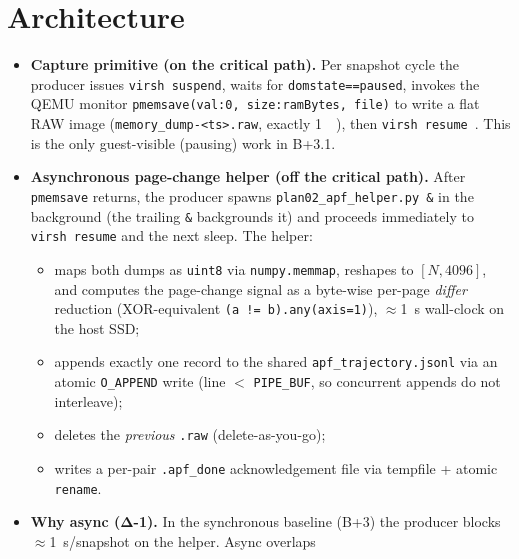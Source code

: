 \documentclass[conference]{IEEEtran}
\begin{document}
\section{Architecture}
\label{sec:arch}
\begin{itemize}
  \item \textbf{Capture primitive (on the critical path).} Per snapshot cycle
        the producer issues \texttt{virsh suspend}, waits for
        \texttt{domstate==paused}, invokes the QEMU monitor
        \texttt{pmemsave(val:0, size:ramBytes, file)} to write a flat RAW image
        (\texttt{memory\_dump-<ts>.raw}, exactly \SI{1}{\gibi\byte}), then
        \texttt{virsh resume}~\cite{TODO_libvirt_pmemsave}. This is the only
        guest-visible (pausing) work in B+3.1.
  \item \textbf{Asynchronous page-change helper (off the critical path).} After
        \texttt{pmemsave} returns, the producer spawns
        \texttt{plan02\_apf\_helper.py \&} in the background (the trailing
        \texttt{\&} backgrounds it) and proceeds immediately to
        \texttt{virsh resume} and the next sleep. The helper:
    \begin{itemize}
      \item maps both dumps as \texttt{uint8} via \texttt{numpy.memmap},
            reshapes to $[N,4096]$, and computes the page-change signal as a
            byte-wise per-page \emph{differ} reduction (XOR-equivalent
            \texttt{(a != b).any(axis=1)}), $\approx$\SI{1}{\second} wall-clock
            on the host SSD;
      \item appends exactly one record to the shared
            \texttt{apf\_trajectory.jsonl} via an atomic \texttt{O\_APPEND}
            write (line $<$ \texttt{PIPE\_BUF}, so concurrent appends do not
            interleave);
      \item deletes the \emph{previous} \texttt{.raw} (delete-as-you-go);
      \item writes a per-pair \texttt{.apf\_done} acknowledgement file via
            tempfile + atomic \texttt{rename}.
    \end{itemize}
  \item \textbf{Why async (Δ-1).} In the synchronous baseline (B+3) the producer
        blocks $\approx$\SI{1}{\second}/snapshot on the helper. Async overlaps

\end{itemize}
\end{document}
